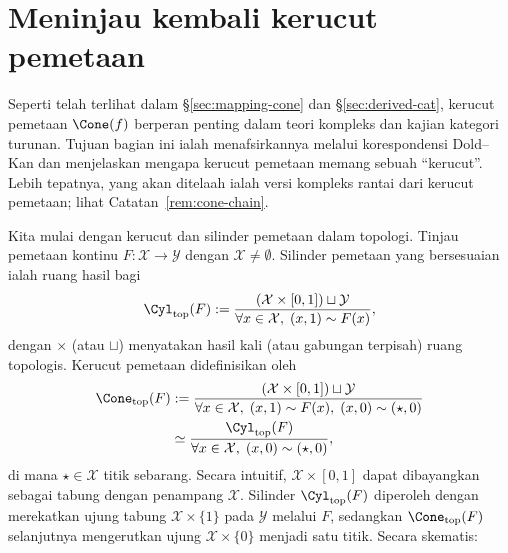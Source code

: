 
\section{Meninjau kembali kerucut pemetaan}\label{sec:mapping-cone-revisited}
\hypertarget{o014.aljabr2.chapter8.mapping-cone-revisited}{ }
Seperti telah terlihat dalam \S\ref{sec:mapping-cone} dan
\S\ref{sec:derived-cat}, kerucut pemetaan $\Cone(f)$ berperan penting
dalam teori kompleks dan kajian kategori turunan. Tujuan bagian ini ialah
menafsirkannya melalui korespondensi Dold--Kan dan menjelaskan mengapa
kerucut pemetaan memang sebuah ``kerucut''. Lebih tepatnya, yang akan
ditelaah ialah versi kompleks rantai dari kerucut pemetaan; lihat
Catatan~\ref{rem:cone-chain}.

Kita mulai dengan kerucut dan silinder pemetaan dalam topologi. Tinjau
pemetaan kontinu $F:\mathcal{X}\to\mathcal{Y}$ dengan
$\mathcal{X}\neq\emptyset$. Silinder pemetaan yang bersesuaian ialah ruang
hasil bagi
\begin{equation*}
	\Cyl_{\mathrm{top}}(F) := \dfrac{(\mathcal{X} \times [0, 1]) \sqcup \mathcal{Y}}{\forall x \in \mathcal{X}, \; (x, 1) \sim F(x)},
\end{equation*}
dengan $\times$ (atau $\sqcup$) menyatakan hasil kali (atau gabungan
terpisah) ruang topologis. Kerucut pemetaan didefinisikan oleh
\begin{equation*}\begin{aligned}
	\Cone_{\mathrm{top}}(F) & := \dfrac{(\mathcal{X} \times [0, 1]) \sqcup \mathcal{Y}}{\forall x \in \mathcal{X}, \; (x, 1) \sim F(x), \; (x, 0) \sim (\star, 0)} \\
	& \simeq \dfrac{\Cyl_{\mathrm{top}}(F)}{\forall x \in \mathcal{X}, \; (x, 0) \sim (\star, 0)},
\end{aligned}\end{equation*}
di mana $\star\in\mathcal{X}$ titik sebarang. Secara intuitif,
$\mathcal{X}\times[0,1]$ dapat dibayangkan sebagai tabung dengan penampang
$\mathcal{X}$. Silinder $\Cyl_{\mathrm{top}}(F)$ diperoleh dengan
merekatkan ujung tabung $\mathcal{X}\times\{1\}$ pada $\mathcal{Y}$
melalui $F$, sedangkan $\Cone_{\mathrm{top}}(F)$ selanjutnya mengerutkan
ujung $\mathcal{X}\times\{0\}$ menjadi satu titik. Secara skematis:

